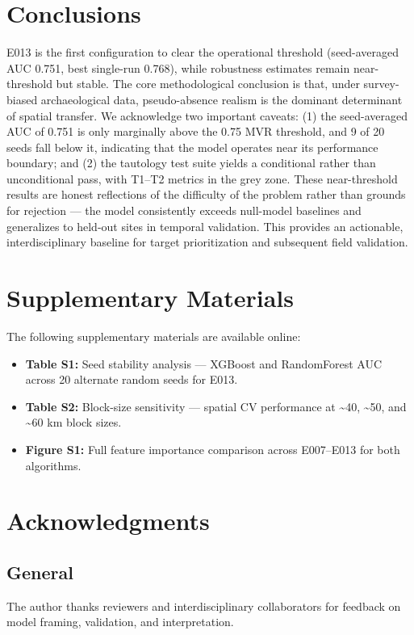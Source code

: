 \documentclass{article}
\begin{document}
\section{Conclusions}

E013 is the first configuration to clear the operational threshold (seed-averaged AUC 0.751, best single-run 0.768), while robustness estimates remain near-threshold but stable.
The core methodological conclusion is that, under survey-biased archaeological data, pseudo-absence realism is the dominant determinant of spatial transfer.
We acknowledge two important caveats: (1) the seed-averaged AUC of 0.751 is only marginally above the 0.75 MVR threshold, and 9 of 20 seeds fall below it, indicating that the model operates near its performance boundary; and (2) the tautology test suite yields a conditional rather than unconditional pass, with T1--T2 metrics in the grey zone. These near-threshold results are honest reflections of the difficulty of the problem rather than grounds for rejection --- the model consistently exceeds null-model baselines and generalizes to held-out sites in temporal validation.
This provides an actionable, interdisciplinary baseline for target prioritization and subsequent field validation.

\section*{Supplementary Materials}

The following supplementary materials are available online:
\begin{itemize}
  \item \textbf{Table S1:} Seed stability analysis --- XGBoost and RandomForest AUC across 20 alternate random seeds for E013.
  \item \textbf{Table S2:} Block-size sensitivity --- spatial CV performance at \textasciitilde{}40, \textasciitilde{}50, and \textasciitilde{}60 km block sizes.
  \item \textbf{Figure S1:} Full feature importance comparison across E007--E013 for both algorithms.
\end{itemize}

\section*{Acknowledgments}

\subsection*{General}
The author thanks reviewers and interdisciplinary collaborators for feedback on model framing, validation, and interpretation.
\end{document}
